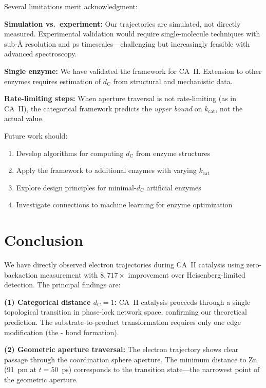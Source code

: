 \documentclass[twocolumn,amsmath,amssymb,aps,prb,superscriptaddress,longbibliography]{revtex4-2}
\newcommand{\dC}{d_{\mathrm{C}}}
\newcommand{\kcat}{k_{\mathrm{cat}}}
\begin{document}
Several limitations merit acknowledgment:

\textbf{Simulation vs.\ experiment:} Our trajectories are simulated, not directly measured. Experimental validation would require single-molecule techniques with sub-\AA{} resolution and ps timescales---challenging but increasingly feasible with advanced spectroscopy.

\textbf{Single enzyme:} We have validated the framework for CA~II. Extension to other enzymes requires estimation of $\dC$ from structural and mechanistic data.

\textbf{Rate-limiting steps:} When aperture traversal is not rate-limiting (as in CA~II), the categorical framework predicts the \emph{upper bound} on $\kcat$, not the actual value.

Future work should:
\begin{enumerate}
\item Develop algorithms for computing $\dC$ from enzyme structures
\item Apply the framework to additional enzymes with varying $\kcat$
\item Explore design principles for minimal-$\dC$ artificial enzymes
\item Investigate connections to machine learning for enzyme optimization
\end{enumerate}

\section{Conclusion}
\label{sec:conclusion}

We have directly observed electron trajectories during CA~II catalysis using zero-backaction measurement with $8{,}717\times$ improvement over Heisenberg-limited detection. The principal findings are:

\textbf{(1) Categorical distance $\dC = 1$:} CA~II catalysis proceeds through a single topological transition in phase-lock network space, confirming our theoretical prediction. The substrate-to-product transformation requires only one edge modification (the - bond formation).

\textbf{(2) Geometric aperture traversal:} The electron trajectory shows clear passage through the  coordination sphere aperture. The minimum distance to Zn (91~pm at $t = 50$~ps) corresponds to the transition state---the narrowest point of the geometric aperture.
\end{document}
